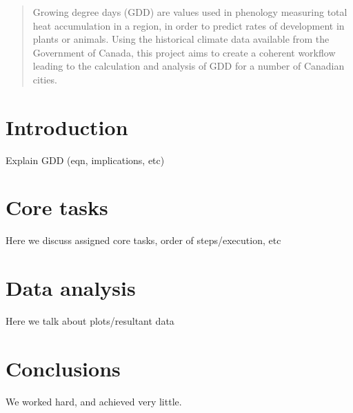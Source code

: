 \documentclass[13pt]{article}
\begin{document}
\maketitle

\begin{abstract}
Growing degree days (GDD) are values used in phenology measuring total heat accumulation in a region, in order to predict rates of development in  plants or animals. Using the historical climate data available from the Government of Canada, this project aims to create a coherent workflow leading to the calculation and analysis of GDD for a number of Canadian cities.  
\end{abstract}

\section{Introduction}
Explain GDD (eqn, implications, etc)


\section{Core tasks}\label{core tasks}
Here we discuss assigned core tasks, order of steps/execution, etc

\section{Data analysis}\label{data analysis}
Here we talk about plots/resultant data

\section{Conclusions}\label{conclusions}
We worked hard, and achieved very little.



\end{document}

